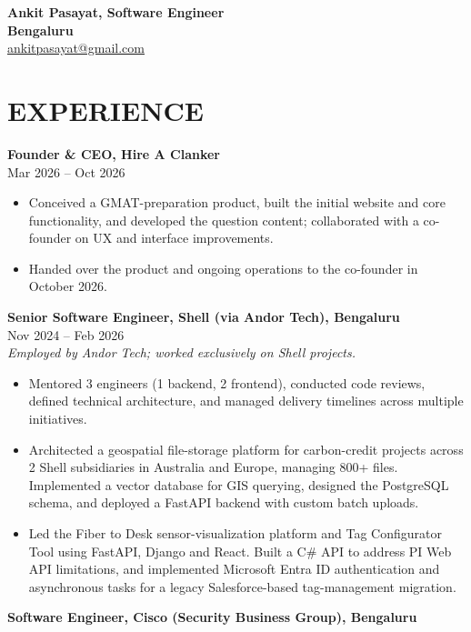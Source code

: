 \documentclass[10pt]{article}
\begin{document}
{\noindent\LARGE\textbf{Ankit Pasayat, Software Engineer}}\\
\textbf{Bengaluru}\\
{\large\hypersetup{urlcolor=black}\href{mailto:ankitpasayat@gmail.com}{ankitpasayat@gmail.com}}

\section*{EXPERIENCE}
\textbf{Founder \& CEO, Hire A Clanker}\\
Mar 2026 -- Oct 2026
\begin{itemize}
  \item Conceived a GMAT-preparation product, built the initial website and core functionality, and developed the question content; collaborated with a co-founder on UX and interface improvements.
  \item Handed over the product and ongoing operations to the co-founder in October 2026.
\end{itemize}
\vspace{4pt}
\textbf{Senior Software Engineer, Shell (via Andor Tech), Bengaluru}\\
Nov 2024 -- Feb 2026\\
\textit{Employed by Andor Tech; worked exclusively on Shell projects.}
\begin{itemize}
  \item Mentored 3 engineers (1 backend, 2 frontend), conducted code reviews, defined technical architecture, and managed delivery timelines across multiple initiatives.
  \item Architected a geospatial file-storage platform for carbon-credit projects across 2 Shell subsidiaries in Australia and Europe, managing 800+ files. Implemented a vector database for GIS querying, designed the PostgreSQL schema, and deployed a FastAPI backend with custom batch uploads.
  \item Led the Fiber to Desk sensor-visualization platform and Tag Configurator Tool using FastAPI, Django and React. Built a C\# API to address PI Web API limitations, and implemented Microsoft Entra ID authentication and asynchronous tasks for a legacy Salesforce-based tag-management migration.
\end{itemize}
\vspace{4pt}
\textbf{Software Engineer, Cisco (Security Business Group), Bengaluru}\\
\end{document}
